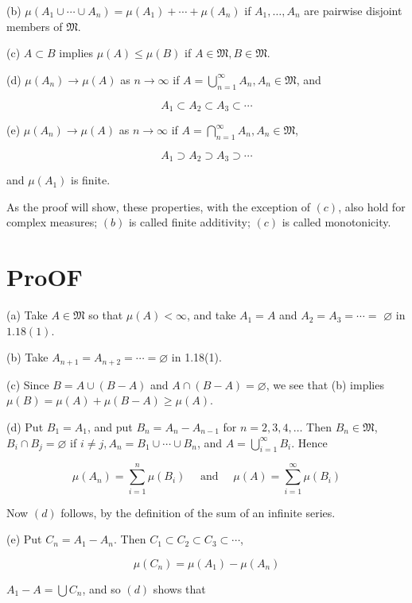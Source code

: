 \documentclass[10pt]{article}
\begin{document}
(b) $\mu\left(A_{1} \cup \cdots \cup A_{n}\right)=\mu\left(A_{1}\right)+\cdots+\mu\left(A_{n}\right)$ if $A_{1}, \ldots, A_{n}$ are pairwise disjoint members of $\mathfrak{M}$.

(c) $A \subset B$ implies $\mu(A) \leq \mu(B)$ if $A \in \mathfrak{M}, B \in \mathfrak{M}$.

(d) $\mu\left(A_{n}\right) \rightarrow \mu(A)$ as $n \rightarrow \infty$ if $A=\bigcup_{n=1}^{\infty} A_{n}, A_{n} \in \mathfrak{M}$, and

$$
A_{1} \subset A_{2} \subset A_{3} \subset \cdots
$$

(e) $\mu\left(A_{n}\right) \rightarrow \mu(A)$ as $n \rightarrow \infty$ if $A=\bigcap_{n=1}^{\infty} A_{n}, A_{n} \in \mathfrak{M}$,

$$
A_{1} \supset A_{2} \supset A_{3} \supset \cdots
$$

and $\mu\left(A_{1}\right)$ is finite.

As the proof will show, these properties, with the exception of $(c)$, also hold for complex measures; $(b)$ is called finite additivity; $(c)$ is called monotonicity.

\section{ProOF}
(a) Take $A \in \mathfrak{M}$ so that $\mu(A)<\infty$, and take $A_{1}=A$ and $A_{2}=A_{3}=\cdots=$ $\varnothing$ in $1.18(1)$.

(b) Take $A_{n+1}=A_{n+2}=\cdots=\varnothing$ in 1.18(1).

(c) Since $B=A \cup(B-A)$ and $A \cap(B-A)=\varnothing$, we see that (b) implies $\mu(B)=\mu(A)+\mu(B-A) \geq \mu(A)$.

(d) Put $B_{1}=A_{1}$, and put $B_{n}=A_{n}-A_{n-1}$ for $n=2,3,4, \ldots$ Then $B_{n} \in \mathfrak{M}$, $B_{i} \cap B_{j}=\varnothing$ if $i \neq j, A_{n}=B_{1} \cup \cdots \cup B_{n}$, and $A=\bigcup_{i=1}^{\infty} B_{i}$. Hence

$$
\mu\left(A_{n}\right)=\sum_{i=1}^{n} \mu\left(B_{i}\right) \quad \text { and } \quad \mu(A)=\sum_{i=1}^{\infty} \mu\left(B_{i}\right)
$$

Now $(d)$ follows, by the definition of the sum of an infinite series.

(e) Put $C_{n}=A_{1}-A_{n}$. Then $C_{1} \subset C_{2} \subset C_{3} \subset \cdots$,

$$
\mu\left(C_{n}\right)=\mu\left(A_{1}\right)-\mu\left(A_{n}\right)
$$

$A_{1}-A=\bigcup C_{n}$, and so $(d)$ shows that
\end{document}
